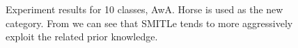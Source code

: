 \begin{figure}
\centering
{}

\caption{Experiment results for 10 classes, AwA. Horse is used as the new category. From \protect{} we can see that SMITLe tends to more aggressively exploit the related prior knowledge.}
\label{fig:awa}
\end{figure}


